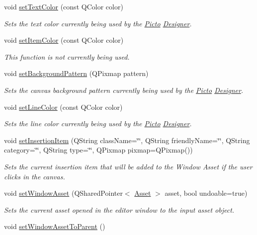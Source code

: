 \begin{DoxyCompactItemize}
void \hyperlink{class_editor_state_a71a280a1ccc7f832b2073dc62936a730}{set\-Text\-Color} (const Q\-Color color)
\begin{DoxyCompactList}\small\item\em Sets the text color currently being used by the \hyperlink{namespace_picto}{Picto} \hyperlink{class_designer}{Designer}. \end{DoxyCompactList}\item 
\hypertarget{class_editor_state_a97266d3f8d232b317c2bbacf9dc46f93}{void \hyperlink{class_editor_state_a97266d3f8d232b317c2bbacf9dc46f93}{set\-Item\-Color} (const Q\-Color color)}\label{class_editor_state_a97266d3f8d232b317c2bbacf9dc46f93}

\begin{DoxyCompactList}\small\item\em This function is not currently being used. \end{DoxyCompactList}\item 
void \hyperlink{class_editor_state_a368a8991432fd7c406ccbb55aaadf983}{set\-Background\-Pattern} (Q\-Pixmap pattern)
\begin{DoxyCompactList}\small\item\em Sets the canvas background pattern currently being used by the \hyperlink{namespace_picto}{Picto} \hyperlink{class_designer}{Designer}. \end{DoxyCompactList}\item 
void \hyperlink{class_editor_state_acb87663efc3c0ecdfbb4964802e4358c}{set\-Line\-Color} (const Q\-Color color)
\begin{DoxyCompactList}\small\item\em Sets the line color currently being used by the \hyperlink{namespace_picto}{Picto} \hyperlink{class_designer}{Designer}. \end{DoxyCompactList}\item 
void \hyperlink{class_editor_state_aa14e5b1cc9e0cf0221359c7ea8df382a}{set\-Insertion\-Item} (Q\-String class\-Name=\char`\"{}\char`\"{}, Q\-String friendly\-Name=\char`\"{}\char`\"{}, Q\-String category=\char`\"{}\char`\"{}, Q\-String type=\char`\"{}\char`\"{}, Q\-Pixmap pixmap=Q\-Pixmap())
\begin{DoxyCompactList}\small\item\em Sets the current insertion item that will be added to the Window Asset if the user clicks in the canvas. \end{DoxyCompactList}\item 
void \hyperlink{class_editor_state_ad9447b01659213315d32929fb3b353c8}{set\-Window\-Asset} (Q\-Shared\-Pointer$<$ \hyperlink{class_picto_1_1_asset}{Asset} $>$ asset, bool undoable=true)
\begin{DoxyCompactList}\small\item\em Sets the current asset opened in the editor window to the input asset object. \end{DoxyCompactList}\item 
\hypertarget{class_editor_state_a988d247204ba5ef2e8e209eb33bcef39}{void \hyperlink{class_editor_state_a988d247204ba5ef2e8e209eb33bcef39}{set\-Window\-Asset\-To\-Parent} ()}\label{class_editor_state_a988d247204ba5ef2e8e209eb33bcef39}


\end{DoxyCompactItemize}
